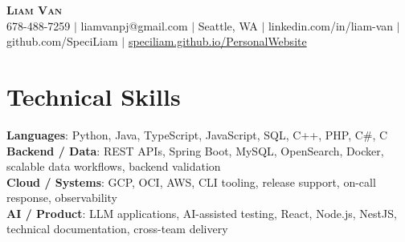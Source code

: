 \documentclass[letterpaper,11pt]{article}
\begin{document}

%
\begin{center}
    \textbf{\Huge \scshape Liam Van} \\ \vspace{1pt}
    \small 678-488-7259 $|$ \small {liamvanpj@gmail.com} $|$ Seattle, WA
 {{$|$ linkedin.com/in/liam-van} {$|$ github.com/SpeciLiam} {$|$ \href{https://speciliam.github.io/PersonalWebsite}{speciliam.github.io/PersonalWebsite}}}

\end{center}

\section{Technical Skills}
 \begin{itemize}[leftmargin=0.15in, label={}]
    \small{\item{
     \textbf{Languages}{: Python, Java, TypeScript, JavaScript, SQL, C++, PHP, C\#, C} \\
     \textbf{Backend / Data}{: REST APIs, Spring Boot, MySQL, OpenSearch, Docker, scalable data workflows, backend validation} \\
     \textbf{Cloud / Systems}{: GCP, OCI, AWS, CLI tooling, release support, on-call response, observability} \\
     \textbf{AI / Product}{: LLM applications, AI-assisted testing, React, Node.js, NestJS, technical documentation, cross-team delivery} \\
    }}
 \end{itemize}
%
\end{document}
